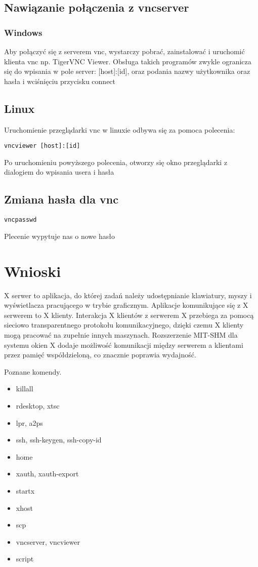 \documentclass[a4paper,11pt,notitlepage]{article}
\begin{document}
\subsection{Nawiązanie połączenia z vncserver}
\subsubsection{Windows}
Aby połączyć się z serverem vnc, wystarczy pobrać, zainstalować i 
uruchomić klienta vnc np. TigerVNC Viewer. Obsługa takich programów 
zwykle ogranicza się do wpisania w pole server: [host]:[id], oraz 
podania nazwy użytkownika oraz hasła i wciśnięciu przycisku connect
\subsection{Linux}
Uruchomienie przeglądarki vnc w linuxie odbywa się za pomoca polecenia:
\begin{verbatim}
vncviewer [host]:[id]
\end{verbatim}
Po uruchomieniu powyższego polecenia, otworzy się okno przeglądarki z 
dialogiem do wpisania usera i hasła
\subsection{Zmiana hasła dla vnc}
\begin{verbatim}
vncpasswd
\end{verbatim}
Plecenie wypytuje nas o nowe hasło

\pagebreak

\section{Wnioski}
X serwer to aplikacja, do której zadań należy udostępnianie klawiatury, myszy i wyświetlacza pracującego w trybie graficznym. Aplikacje komunikujące się z X serwerem to X klienty. Interakcja X klientów z serwerem X przebiega za pomocą sieciowo transparentnego protokołu komunikacyjnego, dzięki czemu X klienty mogą pracować na zupełnie innych maszynach. Rozszerzenie MIT-SHM dla systemu okien X dodaje możliwość komunikacji między serwerem a klientami przez pamięć współdzieloną, co znacznie poprawia wydajność.


Poznane komendy.
\begin{itemize}
    \item killall
    \item rdesktop, xtsc
    \item lpr, a2ps
    \item ssh, ssh-keygen, ssh-copy-id
    \item home
    \item xauth, xauth-export
    \item startx
    \item xhost
    \item scp
    \item vncserver, vncviewer
    \item script
\end{itemize}
\end{document}
